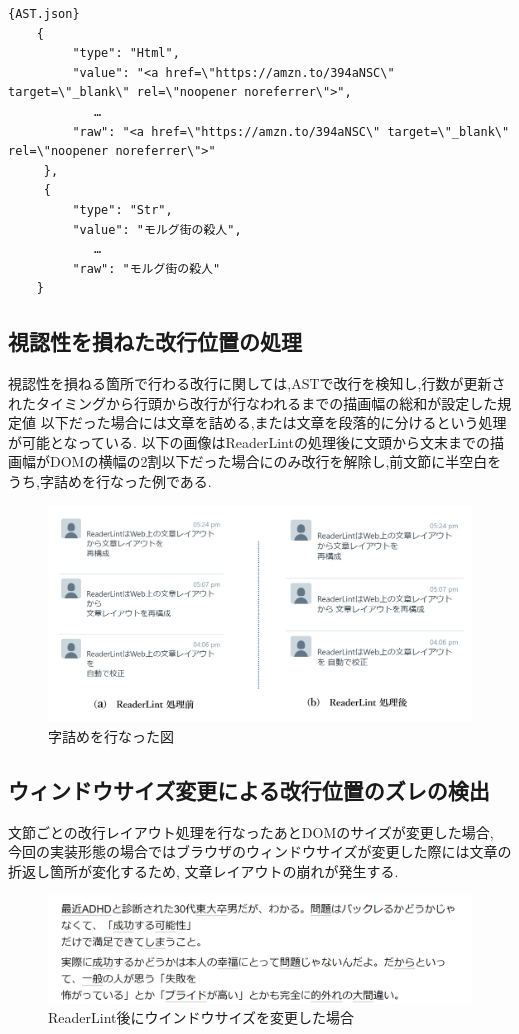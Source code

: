 
\begin{lstlisting}{AST.json}
    {
         "type": "Html",
         "value": "<a href=\"https://amzn.to/394aNSC\" target=\"_blank\" rel=\"noopener noreferrer\">",
            …
         "raw": "<a href=\"https://amzn.to/394aNSC\" target=\"_blank\" rel=\"noopener noreferrer\">"
     },
     {
         "type": "Str",
         "value": "モルグ街の殺人",
            …
         "raw": "モルグ街の殺人"
    }
\end{lstlisting}

\subsection{視認性を損ねた改行位置の処理}
視認性を損ねる箇所で行わる改行に関しては,ASTで改行を検知し,行数が更新されたタイミングから行頭から改行が行なわれるまでの描画幅の総和が設定した規定値
以下だった場合には文章を詰める,または文章を段落的に分けるという処理が可能となっている.
以下の画像はReaderLintの処理後に文頭から文末までの描画幅がDOMの横幅の2割以下だった場合にのみ改行を解除し,前文節に半空白をうち,字詰めを行なった例である.

\begin{figure}[H]
    \centering
    \label{fig:jutsume}
    \includegraphics[width=0.7\columnwidth]{image/03/img10.png}
	\caption[字詰めを行なった図]{字詰めを行なった図}
\end{figure}

\subsection{ウィンドウサイズ変更による改行位置のズレの検出}
文節ごとの改行レイアウト処理を行なったあとDOMのサイズが変更した場合,
今回の実装形態の場合ではブラウザのウィンドウサイズが変更した際には文章の折返し箇所が変化するため,
文章レイアウトの崩れが発生する.

\begin{figure}[H]
    \centering
    \label{fig:resize}
    \includegraphics[width=0.7\columnwidth]{image/03/img9.png}
	\caption[ReaderLint後にウインドウサイズを変更した場合]{ReaderLint後にウインドウサイズを変更した場合}
\end{figure}

